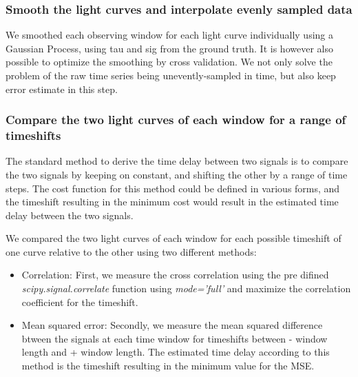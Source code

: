 \documentclass[a4paper, 11pt]{article}
\begin{document}
\subsubsection{Smooth the light curves and interpolate evenly sampled data}
We smoothed each observing window for each light curve individually using a Gaussian Process, using tau and sig from the ground truth. It is however also possible to optimize the smoothing by cross validation. We not only solve the problem of the raw time series being unevently-sampled in time, but also keep error estimate in this step.

\subsubsection{Compare the two light curves of each window for a range of timeshifts}
The standard method to derive the time delay between two signals is to compare the two signals by keeping on constant, and shifting the other by a range of time steps. The cost function for this method could be defined in various forms, and the timeshift resulting in the minimum cost would result in the estimated time delay between the two signals.

We compared the two light curves of each window for each possible timeshift of one curve relative to the other using two different methods:
\begin{itemize}
  \item Correlation: First, we measure the cross correlation using the pre difined \emph{scipy.signal.correlate} function using \emph{mode='full'} and maximize the correlation coefficient for the timeshift.
  \item Mean squared error: 
Secondly, we measure the mean squared difference btween the signals at each time window for timeshifts between - window length and + window length. The estimated time delay according to this method is the timeshift resulting in the minimum value for the MSE.
\end{itemize}
\end{document}
